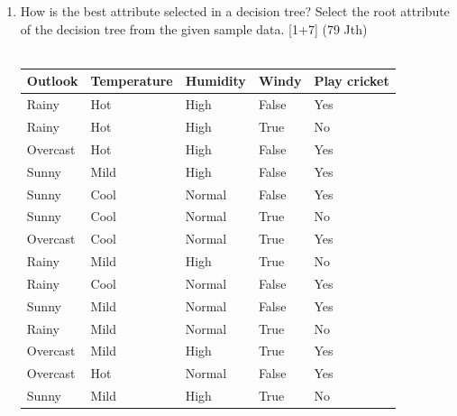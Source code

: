 \documentclass[12pt]{article}
\newcommand{\enter}{\\\textcolor{white}{1}}
\begin{document}
\begin{enumerate}[topsep=0pt, noitemsep]
      \item How is the best attribute selected in a decision tree? Select the root attribute of the decision tree from the given sample data. \hfill [1+7] (79 Jth)
        \enter
        \begin{tabular}{|l|l|l|l|l|}
          \hline
          Outlook & Temperature & Humidity & Windy & Play cricket \\ \hline
          Rainy & Hot & High & False & Yes \\
          Rainy & Hot & High & True & No \\
          Overcast & Hot & High & False & Yes \\
          Sunny & Mild & High & False & Yes \\
          Sunny & Cool & Normal & False & Yes \\
          Sunny & Cool & Normal & True & No \\
          Overcast & Cool & Normal & True & Yes \\
          Rainy & Mild & High & True & No \\
          Rainy & Cool & Normal & False & Yes \\
          Sunny & Mild & Normal & False & Yes \\
          Rainy & Mild & Normal & True & No \\
          Overcast & Mild & High & True & Yes \\
          Overcast & Hot & Normal & False & Yes \\
          Sunny & Mild & High & True & No \\ \hline
        \end{tabular}


\end{enumerate}
\end{document}
